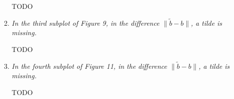 \documentclass[11pt]{letter}
\newcommand{\revA}[1]{{\color{red}#1}}
\begin{document}
\begin{letter}{}
\begin{enumerate}[label=\arabic*.]
\begin{enumerate}[label=\alph*)]
    \revA{TODO} %


    \item \emph{%
    In the third subplot of Figure 9, in the difference $\| \tilde b - b \|$,
    a tilde is missing.
    }

    \revA{TODO} %


    \item \emph{%
    In the fourth subplot of Figure 11, in the difference $\| \tilde b - b \|$,
    a tilde is missing.
    }

    \revA{TODO} %
  \end{enumerate}
\end{enumerate}








\end{letter}
\end{document}
